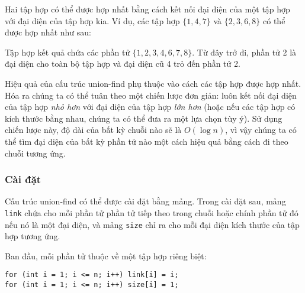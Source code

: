 Hai tập hợp có thể được hợp nhất bằng cách kết nối
đại diện của một tập hợp với
đại diện của tập hợp kia.
Ví dụ, các tập hợp
$\{1,4,7\}$ và $\{2,3,6,8\}$
có thể được hợp nhất như sau:
\begin{center}
\end{center}

Tập hợp kết quả chứa các phần tử
$\{1,2,3,4,6,7,8\}$.
Từ đây trở đi, phần tử 2 là đại diện
cho toàn bộ tập hợp và đại diện cũ 4
trỏ đến phần tử 2.

Hiệu quả của cấu trúc union-find phụ thuộc vào
cách các tập hợp được hợp nhất.
Hóa ra chúng ta có thể tuân theo một chiến lược đơn giản:
luôn kết nối đại diện của
tập hợp \emph{nhỏ hơn} với đại diện của tập hợp \emph{lớn hơn}
(hoặc nếu các tập hợp có kích thước bằng nhau,
chúng ta có thể đưa ra một lựa chọn tùy ý).
Sử dụng chiến lược này, độ dài của bất kỳ chuỗi nào
sẽ là $O(\log n)$, vì vậy chúng ta có thể
tìm đại diện của bất kỳ phần tử nào
một cách hiệu quả bằng cách đi theo chuỗi tương ứng.

\subsubsection{Cài đặt}

Cấu trúc union-find có thể được cài đặt
bằng mảng.
Trong cài đặt sau,
mảng \texttt{link} chứa cho mỗi phần tử
phần tử tiếp theo
trong chuỗi hoặc chính phần tử đó nếu nó là
một đại diện,
và mảng \texttt{size} chỉ ra cho mỗi đại diện
kích thước của tập hợp tương ứng.

Ban đầu, mỗi phần tử thuộc về một tập hợp riêng biệt:
\begin{lstlisting}
for (int i = 1; i <= n; i++) link[i] = i;
for (int i = 1; i <= n; i++) size[i] = 1;
\end{lstlisting}

